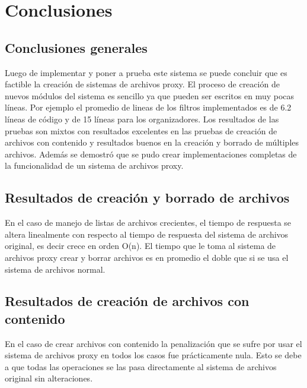 \def\baselinestretch{1}
\chapter{Conclusiones}
\ifpdf
    \graphicspath{{Conclusions/ConclusionsFigs/PNG/}{Conclusions/ConclusionsFigs/PDF/}{Conclusions/ConclusionsFigs/}}
\else
    \graphicspath{{Conclusions/ConclusionsFigs/EPS/}{Conclusions/ConclusionsFigs/}}
\fi

\section{Conclusiones generales}

Luego de implementar y poner a prueba este sistema se puede concluir que es factible la creación de sistemas de archivos proxy. El proceso de creación de nuevos módulos del sistema es sencillo ya que pueden ser escritos en muy pocas líneas. Por ejemplo el promedio de lineas de los filtros implementados es de 6.2 líneas de código y de 15 líneas para los organizadores. Los resultados de las pruebas son mixtos con resultados excelentes en las pruebas de creación de archivos con contenido y resultados buenos en la creación y borrado de múltiples archivos. Además se demostró que se pudo crear implementaciones completas de la funcionalidad de un sistema de archivos proxy.

\section{Resultados de creación y borrado de archivos}

En el caso de manejo de listas de archivos crecientes, el tiempo de respuesta se altera linealmente con respecto al tiempo de respuesta del sistema de archivos original, es decir crece en orden O(n). El tiempo que le toma al sistema de archivos proxy crear y borrar archivos es en promedio el doble que si se usa el sistema de archivos normal.

\section{Resultados de creación de archivos con contenido}

En el caso de crear archivos con contenido la penalización que se sufre por usar el sistema de archivos proxy en todos los casos fue prácticamente nula. Esto se debe a que todas las operaciones se las pasa directamente al sistema de archivos original sin alteraciones.

